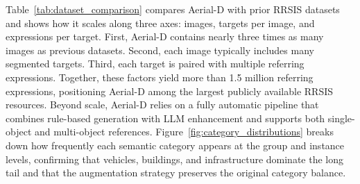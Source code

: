Table~\ref{tab:dataset_comparison} compares Aerial-D with prior RRSIS datasets and shows how it scales along three axes: images, targets per image, and expressions per target. First, Aerial-D contains nearly three times as many images as previous datasets. Second, each image typically includes many segmented targets. Third, each target is paired with multiple referring expressions. Together, these factors yield more than 1.5 million referring expressions, positioning Aerial-D among the largest publicly available RRSIS resources. Beyond scale, Aerial-D relies on a fully automatic pipeline that combines rule-based generation with LLM enhancement and supports both single-object and multi-object references. Figure~\ref{fig:category_distributions} breaks down how frequently each semantic category appears at the group and instance levels, confirming that vehicles, buildings, and infrastructure dominate the long tail and that the augmentation strategy preserves the original category balance.

\begin{table}[t]
\centering
\caption{Comparison with Existing RRSIS Datasets}
\label{tab:dataset_comparison}
\end{table}

